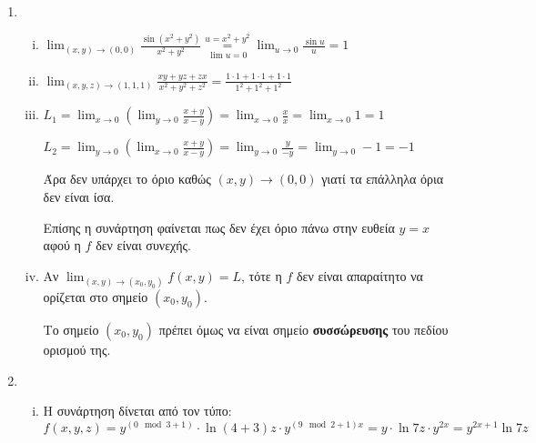 



\everymath{\displaystyle}
\setlength{\tabcolsep}{1cm}




\begin{center}
\end{center}

\vspace{\baselineskip}

\begin{enumerate}
	\setlength\itemsep{2em}
	\item  

		\begin{enumerate}[i)]
			\item $ \lim_{(x,y)\to(0,0)} \frac{\sin{(x^{2}+y^{2})}}{x^{2}+y^{2}} \underset{\lim u = 0}
				{\overset{u=x^{2}+y^{2}}{=}} \lim_{u\to 0} \frac{\sin{u}}{u} = 1 $

			\item $ \lim_{(x,y,z)\to (1,1,1)} \frac{xy+yz+zx}{x^{2}+y^{2}+z^{2}} = \frac{1 \cdot 1 + 1 \cdot 1 + 1 \cdot1}{1^{2}+1^{2}+1^{2}} $

			\item $ L_{1} = \lim_{x\to 0} \left(\lim_{y\to 0} \frac{x+y}{x-y}\right) = \lim_{x\to 0} \frac{x}{x} = \lim_{x\to 0} 1 = 1$

				$ L_{2} = \lim_{y\to 0} \left(\lim_{x\to 0} \frac{x+y}{x-y}\right) = \lim_{y\to 0} \frac{y}{-y}
				= \lim_{y\to 0} -1 = -1 $

				Άρα δεν υπάρχει το όριο καθώς  $ (x,y)\to (0,0) $ γιατί τα επάλληλα όρια δεν είναι ίσα.

				Επίσης η συνάρτηση φαίνεται πως δεν έχει όριο πάνω στην ευθεία $ y=x $ αφού η $f$ δεν είναι
				συνεχής. 

			\item Αν  $ \lim_{(x,y)\to (x_{0},y_{0})} f(x,y) = L $, τότε η $f$ δεν είναι απαραίτητο να ορίζεται
				στο σημείο $ (x_{0},y_{0}) $. 

				Το σημείο  $ (x_{0},y_{0}) $ πρέπει όμως να είναι σημείο \textbf{συσσώρευσης} του  πεδίου ορισμού
				της.
		\end{enumerate}

	\item 
		\begin{enumerate}[i)]
			\item Η συνάρτηση δίνεται από τον τύπο:
				\[
					f(x,y,z) = y^{(0 \mod 3 + 1)} \cdot \ln{(4+3)z} \cdot y^{(9 \mod
					2 + 1)x} = y \cdot \ln{7z} \cdot y^{2x} = y^{2x+1} \ln{7z} 
				\]  


\end{enumerate}
\end{enumerate}
